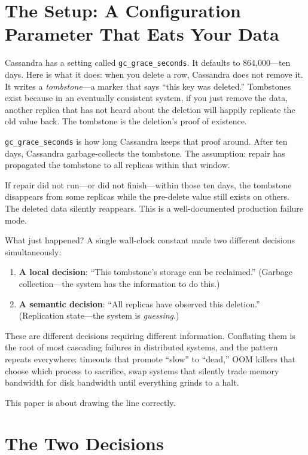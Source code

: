 \documentclass[11pt]{article}
\begin{document}
\section{The Setup: A Configuration Parameter That Eats Your Data}

Cassandra has a setting called \texttt{gc\_grace\_seconds}. It defaults to
864,000---ten days. Here is what it does: when you delete a row, Cassandra does
not remove it. It writes a \emph{tombstone}---a marker that says ``this key was
deleted.'' Tombstones exist because in an eventually consistent system, if you
just remove the data, another replica that has not heard about the deletion will
happily replicate the old value back. The tombstone is the deletion's proof of
existence.

\texttt{gc\_grace\_seconds} is how long Cassandra keeps that proof around.
After ten days, Cassandra garbage-collects the tombstone. The assumption: repair
has propagated the tombstone to all replicas within that window.

If repair did not run---or did not finish---within those ten days, the tombstone
disappears from some replicas while the pre-delete value still exists on others.
The deleted data silently reappears. This is a well-documented production
failure mode.

What just happened? A single wall-clock constant made two different decisions
simultaneously:

\begin{enumerate}
  \item \textbf{A local decision}: ``This tombstone's storage can be
    reclaimed.'' (Garbage collection---the system has the information to do
    this.)
  \item \textbf{A semantic decision}: ``All replicas have observed this
    deletion.'' (Replication state---the system is \emph{guessing}.)
\end{enumerate}

These are different decisions requiring different information. Conflating them is
the root of most cascading failures in distributed systems, and the pattern
repeats everywhere: timeouts that promote ``slow'' to ``dead,'' OOM killers that
choose which process to sacrifice, swap systems that silently trade memory
bandwidth for disk bandwidth until everything grinds to a halt.

This paper is about drawing the line correctly.

\section{The Two Decisions}
\end{document}
